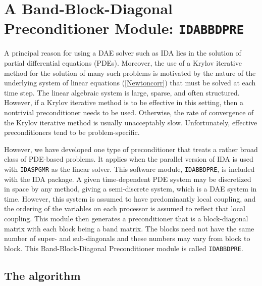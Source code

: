 \documentclass[11pt]{article}
\begin{document}
\section{A Band-Block-Diagonal Preconditioner Module: {\tt IDABBDPRE}}

A principal reason for using a DAE solver such as IDA lies in the
solution of partial differential equations (PDEs).  Moreover, the use
of a Krylov iterative method for the solution of many such problems is
motivated by the nature of the underlying system of linear equations
(\ref{Newtoncorr}) that must be solved at each time step.  The linear
algebraic system is large, sparse, and often structured. However, if a
Krylov iterative method is to be effective in this setting, then a
nontrivial preconditioner needs to be used.  Otherwise, the rate of
convergence of the Krylov iterative method is usually unacceptably
slow.  Unfortunately, effective preconditioners tend to be
problem-specific.

However, we have developed one type of preconditioner that treats a
rather broad class of PDE-based problems.  It applies when the
parallel version of IDA is used with {\tt IDASPGMR} as the linear
solver. This software module, {\tt IDABBDPRE}, is included with the IDA 
package. A given time-dependent PDE system may be discretized in space by any
method, giving a semi-discrete system, which is a DAE system in time.
However, this system is assumed to have predominantly local coupling,
and the ordering of the variables on each processor is assumed to
reflect that local coupling.  This module then generates a
preconditioner that is a block-diagonal matrix with each block being a
band matrix. The blocks need not have the same number of super- and
sub-diagonals and these numbers may vary from block to block. This
Band-Block-Diagonal Preconditioner module is called {\tt IDABBDPRE}.


\subsection{The algorithm}
\end{document}
